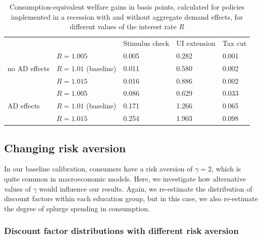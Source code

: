\documentclass[\econtexRoot/HAFiscal]{subfiles}
\begin{document}
\begin{table}[]
  \begin{center}
    \begin{tabular}{@{}lllll@{}}
      \toprule
      &                    & Stimulus check & UI extension & Tax cut \\ \cmidrule(l){1-5} 
      \multirow{3}{*}{no AD effects}            	& $R = 1.005$ 			& 0.005        & 0.282       & 0.001	\\
      & $R = 1.01$ (baseline) & 0.011        & 0.580       & 0.002   	\\
      & $R = 1.015$ 			& 0.016        & 0.886       & 0.002   	\\ \cmidrule(l){1-5}
      \multirow{3}{*}{AD effects}					& $R = 1.005$    		& 0.086        & 0.629       & 0.033  	\\		
      & $R = 1.01$ (baseline) & 0.171        & 1.266       & 0.065   	\\
      & $R = 1.015$    		& 0.254        & 1.903       & 0.098    \\ \cmidrule(l){1-5} 
    \end{tabular}
    \caption{Consumption-equivalent welfare gains in basis points, calculated for policies implemented in a recession with and without aggregate demand effects, for different values of the interest rate $R$}
    \notinsubfile{\label{tab:robustness_R_results}}
  \end{center}
\end{table}


\FloatBarrier
\hypertarget{changing-risk-aversion}{}\par\subsection{Changing risk aversion} 
\notinsubfile{\label{sec:robust_gamma}} 

In our baseline calibration, consumers have a risk aversion of $\gamma=2$, which is quite common in macroeconomic models. Here, we investigate how alternative values of $\gamma$ would influence our results. Again, we re-estimate the distribution of discount factors within each education group, but in this case, we also re-estimate the degree of splurge spending in consumption. 

\subsubsection{Discount factor distributions with different risk aversion}
\notinsubfile{\label{sec:robust_gamma_estim}}
\end{document}
